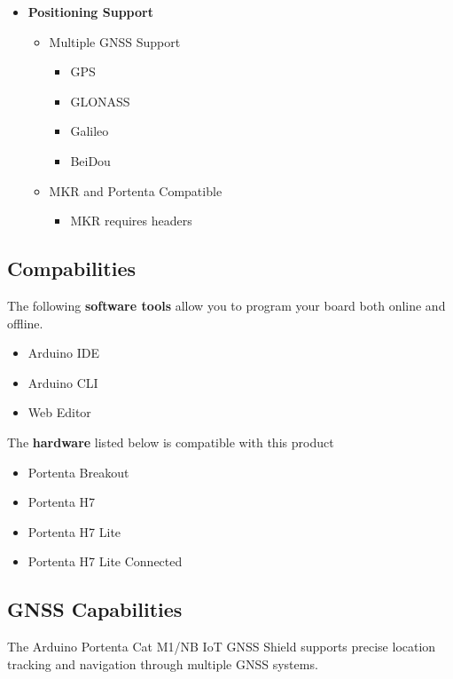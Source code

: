 \begin{itemize}[leftmargin=*]
\begin{itemize}[leftmargin=*]
		\end{itemize}
				
		\item \textbf{Positioning Support}
		\begin{itemize}[leftmargin=*]
			\item Multiple GNSS Support
			\begin{itemize}[label=--]
				\item GPS
				\item GLONASS
				\item Galileo
				\item BeiDou
			\end{itemize}
			\item MKR and Portenta Compatible
			\begin{itemize}[label=--]
				\item MKR requires headers
			\end{itemize}
		\end{itemize}
	\end{itemize}


\subsection{Compabilities} \cite{ArduinoPortenta:2024}
The following \textbf{software tools} allow you to program your board both online and offline.
\begin{itemize}
	\item Arduino IDE
	\item Arduino CLI
	\item Web Editor
\end{itemize}
The \textbf{hardware} listed below is compatible with this product
\begin{itemize}
	\item Portenta Breakout
	\item Portenta H7
	\item Portenta H7 Lite
	\item Portenta H7 Lite Connected
\end{itemize}

\subsection{GNSS Capabilities}

The Arduino Portenta Cat M1/NB IoT GNSS Shield supports precise location tracking and navigation through multiple GNSS systems. \cite{ArduinoPortenta:2024}

